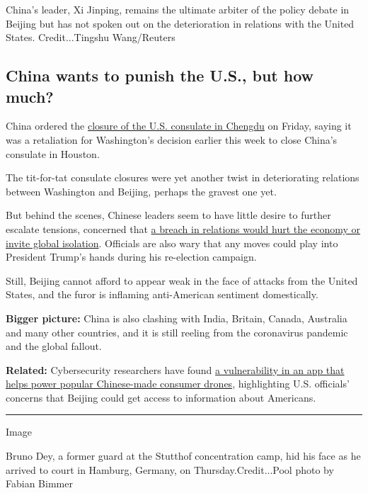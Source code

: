 China's leader, Xi Jinping, remains the ultimate arbiter of the policy
debate in Beijing but has not spoken out on the deterioration in
relations with the United States. Credit...Tingshu Wang/Reuters

\hypertarget{china-wants-to-punish-the-us-but-how-much}{%
\subsection{China wants to punish the U.S., but how
much?}\label{china-wants-to-punish-the-us-but-how-much}}

China ordered the
\href{https://www.nytimes.com/2020/07/24/world/asia/china-us-consulate-chengdu.html}{closure
of the U.S. consulate in Chengdu} on Friday, saying it was a retaliation
for Washington's decision earlier this week to close China's consulate
in Houston.

The tit-for-tat consulate closures were yet another twist in
deteriorating relations between Washington and Beijing, perhaps the
gravest one yet.

But behind the scenes, Chinese leaders seem to have little desire to
further escalate tensions, concerned that
\href{https://www.nytimes.com/2020/07/23/world/asia/us-china-consulate.html}{a
breach in relations would hurt the economy or invite global isolation}.
Officials are also wary that any moves could play into President Trump's
hands during his re-election campaign.

Still, Beijing cannot afford to appear weak in the face of attacks from
the United States, and the furor is inflaming anti-American sentiment
domestically.

\textbf{Bigger picture:} China is also clashing with India, Britain,
Canada, Australia and many other countries, and it is still reeling from
the coronavirus pandemic and the global fallout.

\textbf{Related:} Cybersecurity researchers have found
\href{https://www.nytimes.com/2020/07/23/us/politics/dji-drones-security-vulnerability.html}{a
vulnerability in an app that helps power popular Chinese-made consumer
drones}, highlighting U.S. officials' concerns that Beijing could get
access to information about Americans.

\begin{center}\rule{0.5\linewidth}{\linethickness}\end{center}

Image

Bruno Dey, a former guard at the Stutthof concentration camp, hid his
face as he arrived to court in Hamburg, Germany, on
Thursday.Credit...Pool photo by Fabian Bimmer

